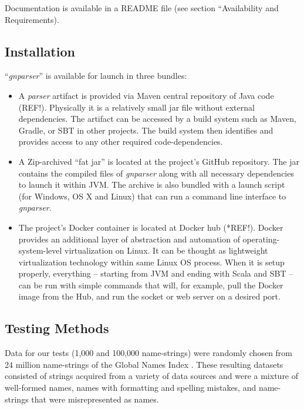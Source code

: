 \documentclass{bmcart}
\begin{document}
Documentation is available in a README file (see section ``Availability and
Requirements).

\subsection*{Installation}

``\textit{gnparser}'' is available for launch in three bundles:

\begin{itemize}

  \item A \textit{parser} artifact is provided via Maven central repository of
    Java code (REF!). Physically it is a relatively small jar file without
    external dependencies. The artifact can be accessed by a build system such
    as Maven, Gradle, or SBT in other projects. The build system then
    identifies and provides access to any other required code-dependencies.

  \item A Zip-archived ``fat jar'' is located at the project's GitHub
    repository.  The jar contains the compiled files of \textit{gnparser} along
    with all necessary dependencies to launch it within JVM. The archive is
    also bundled with a launch script (for Windows, OS X and Linux) that can
    run a command line interface to \textit{gnparser}.

  \item The project's Docker container is located at Docker hub  (*REF!).
    Docker provides an additional layer of abstraction and automation of
    operating-system-level virtualization on Linux. It can be thought as
    lightweight virtualization technology within same Linux OS process. When it
    is setup properly, everything -- starting from JVM and ending with Scala
    and SBT -- can be run with simple commands that will, for example,  pull
    the Docker image from the Hub, and run the socket or web server on a
    desired port.

\end{itemize}

\subsection*{Testing Methods}

Data for our tests (1,000 and 100,000 name-strings) were randomly chosen from
24 million name-strings of the Global Names Index \cite{gn:index}. These
resulting datasets consisted of strings acquired from a variety of data sources
and were a mixture of well-formed names, names with formatting and spelling
mistakes, and name-strings that were misrepresented as names.
\end{document}
